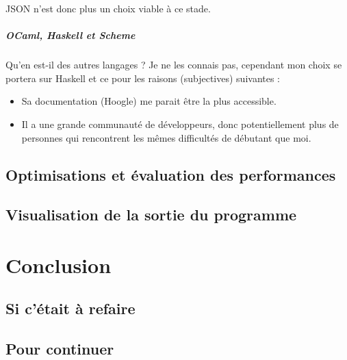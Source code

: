 \documentclass[]{article}
\begin{document}
JSON n'est donc plus un choix viable à ce stade.

\subparagraph*{OCaml, Haskell et Scheme}
Qu'en est-il des autres langages ? Je ne les connais pas, cependant mon choix se portera sur Haskell et ce pour les raisons (subjectives) suivantes :
\begin{itemize}
	\item Sa documentation (Hoogle) me parait être la plus accessible.
	\item Il a une grande communauté de développeurs, donc potentiellement plus de personnes qui rencontrent les mêmes difficultés de débutant que moi.
\end{itemize}

\subsection{Optimisations et évaluation des performances}

\subsection{Visualisation de la sortie du programme}

\section{Conclusion}
\subsection{Si c'était à refaire}
\subsection{Pour continuer}



\end{document}
